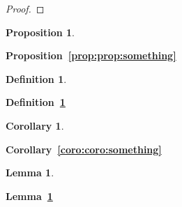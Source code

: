 \documentclass{book}
\newtheorem{lemma}[theorem]{Lemma}
\newtheorem{proposition}[theorem]{Proposition}
\newtheorem{corollary}[theorem]{Corollary}
\newtheorem{definition}[theorem]{Definition}
\newcommand{\defref}[1]{{\bfseries Definition~\ref{#1}}}
\newcommand{\deflabel}[1]{\label{def:#1}}
\newcommand{\lemmref}[1]{{\bfseries Lemma~\ref{#1}}}
\newcommand{\lemmlabel}[1]{\label{lem:#1}}
\newcommand{\propref}[1]{{\bfseries Proposition~\ref{prop:#1}}}
\newcommand{\proplabel}[1]{\label{prop:#1}}
\newcommand{\cororef}[1]{{\bfseries Corollary~\ref{coro:#1}}}
\newcommand{\corolabel}[1]{\label{coro:#1}}
\begin{document}
    \begin{proof}%
    \end{proof}

    \begin{proposition}\proplabel{something}%
    \end{proposition}
    \propref{prop:something}%

    \begin{definition}\deflabel{something}%
    \end{definition}
    \defref{def:something}%

    \begin{corollary}\corolabel{something}%
    \end{corollary}
    \cororef{coro:something}%

    \begin{lemma}\lemmlabel{something}%
    \end{lemma}
    \lemmref{lem:something}%
\end{document}
